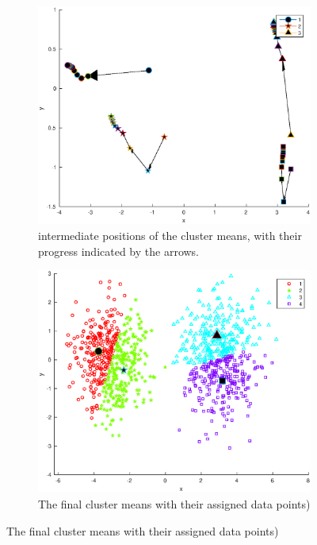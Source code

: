 \documentclass[10pt]{article}
\begin{document}
\begin{figure}[H]
  \centering
  \caption{Results for k=4}
  \begin{subfigure}[b]{.45\textwidth}
    \includegraphics[width=\columnwidth]{Fig1_k4.eps}
    \caption{intermediate positions of the cluster means, 
    with their progress indicated by the arrows.}
  \end{subfigure}
  \quad
  \begin{subfigure}[b]{.45\textwidth}
    \includegraphics[width=\columnwidth]{Fig2_k4.eps}
    \caption{The final cluster means with their assigned data points)}
  \end{subfigure}
\end{figure}
\end{document}
